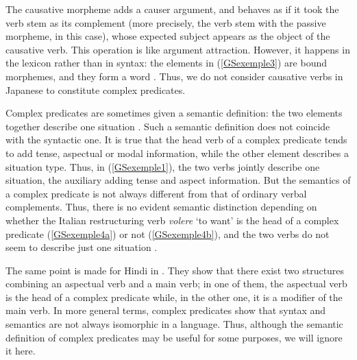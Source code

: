{
\z

The causative morpheme adds a causer argument, and behaves as if it took the verb stem as its complement (more precisely, the verb stem with the passive morpheme, in this case), whose expected subject appears as the object of the causative verb. This operation is like argument attraction. However, it happens in the lexicon rather than in syntax: the elements in (\ref{GSexemple3}) are bound morphemes, and they form a word \citep{manning1999lexical, gunji2012topics}. Thus, we do not consider causative verbs in Japanese to constitute complex predicates.

Complex predicates are sometimes given a semantic definition: the two elements together describe one situation \citep{butt1995structure}. Such a semantic definition does not coincide with the syntactic one. It is true that the head verb of a complex predicate tends to add tense, aspectual or modal information, while the other element describes a situation type. Thus, in (\ref{GSexemple1}), the two verbs jointly describe one situation, the auxiliary adding tense and aspect information. But the semantics of a complex predicate is not always different from that of ordinary verbal complements. Thus, there is no evident semantic distinction depending on whether the Italian restructuring verb \emph{volere} `to want' is the head of a complex predicate (\ref{GSexemple4a}) or not (\ref{GSexemple4b}), and the two verbs do not seem to describe just one situation \citep[314]{Monachesi98a}.  

\eal 
	\label{GSexemple4} 
	\label{GSexemple4a}
		
	\label{GSexemple4b} 
\zl

The same point is made for Hindi in \cite{poornima2009hindi}. They show that there exist two structures combining an aspectual verb and a main verb; in one of them, the aspectual verb is the head of a complex predicate while, in the other one, it is a modifier of the main verb. In more general terms, complex predicates show that syntax and semantics are not always isomorphic in a language. Thus, although the semantic definition of complex predicates may be useful for some purposes, we will ignore it here.

}
